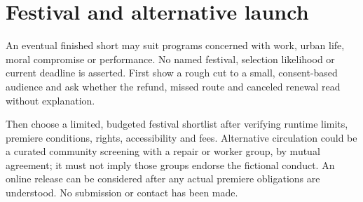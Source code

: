 \section{Festival and alternative launch}
An eventual finished short may suit programs concerned with work, urban life, moral compromise or performance. No named festival, selection likelihood or current deadline is asserted. First show a rough cut to a small, consent-based audience and ask whether the refund, missed route and canceled renewal read without explanation.

Then choose a limited, budgeted festival shortlist after verifying runtime limits, premiere conditions, rights, accessibility and fees. Alternative circulation could be a curated community screening with a repair or worker group, by mutual agreement; it must not imply those groups endorse the fictional conduct. An online release can be considered after any actual premiere obligations are understood. No submission or contact has been made.
